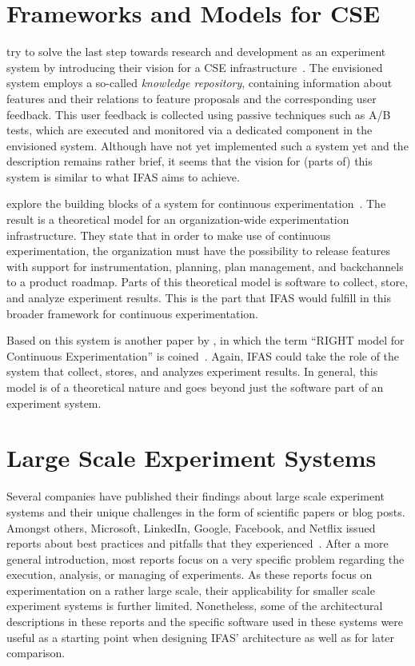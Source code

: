 \section{Frameworks and Models for \ac{CSE}}
\label{sec:related:frameworks}

\citeauthor{Johanssen2017} try to solve the last step towards research and development as an experiment system by introducing their vision for a \ac{CSE} infrastructure~\cite{Johanssen2017}.
The envisioned system employs a so-called \emph{knowledge repository}, containing information about features and their relations to feature proposals and the corresponding user feedback.
This user feedback is collected using passive techniques such as A/B tests, which are executed and monitored via a dedicated component in the envisioned system.
Although \citeauthor{Johanssen2017} have not yet implemented such a system yet and the description remains rather brief, it seems that the vision for (parts of) this system is similar to what \ac{IFAS} aims to achieve.

\citeauthor{Fagerholm2014} explore the building blocks of a system for continuous experimentation~\cite{Fagerholm2014}.
The result is a theoretical model for an organization-wide experimentation infrastructure.
They state that in order to make use of continuous experimentation, the organization must have the possibility to release features with support for instrumentation, planning, plan management, and backchannels to a product roadmap.
Parts of this theoretical model is software to collect, store, and analyze experiment results.
This is the part that \ac{IFAS} would fulfill in this broader framework for continuous experimentation.

Based on this system is another paper by \citeauthor{Fagerholm2017}, in which the term ``RIGHT model for Continuous Experimentation'' is coined~\cite{Fagerholm2017}.
Again, \ac{IFAS} could take the role of the system that collect, stores, and analyzes experiment results.
In general, this model is of a theoretical nature and goes beyond just the software part of an experiment system.

\section{Large Scale Experiment Systems}
\label{sec:related:large}

Several companies have published their findings about large scale experiment systems and their unique challenges in the form of scientific papers or blog posts.
Amongst others, Microsoft, LinkedIn, Google, Facebook, and Netflix issued reports about best practices and pitfalls that they experienced~\cite{Kohavi2013,Xu2015,Tang2010,Bakshy2014,WEB:Netflix:2016}.
After a more general introduction, most reports focus on a very specific problem regarding the execution, analysis, or managing of experiments.
As these reports focus on experimentation on a rather large scale, their applicability for smaller scale experiment systems is further limited.
Nonetheless, some of the architectural descriptions in these reports and the specific software used in these systems were useful as a starting point when designing \ac{IFAS}' architecture as well as for later comparison.



